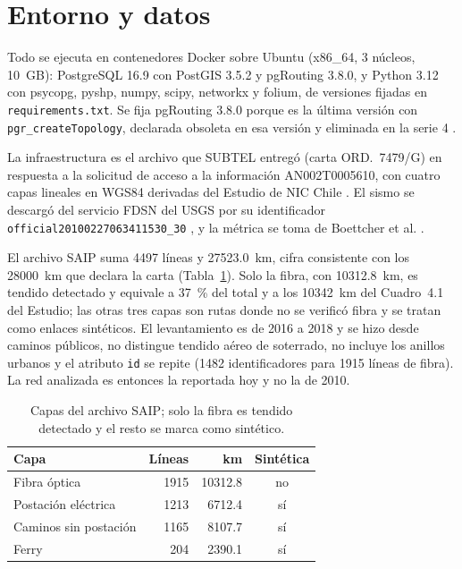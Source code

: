 \documentclass[conference]{IEEEtran}
\begin{document}
\section{Entorno y datos}
\label{sec:datos}
Todo se ejecuta en contenedores Docker sobre Ubuntu (x86\_64, 3 núcleos, \SI{10}{GB}): PostgreSQL 16.9 con PostGIS 3.5.2 y pgRouting 3.8.0, y Python 3.12 con psycopg, pyshp, numpy, scipy, networkx y folium, de versiones fijadas en \texttt{requirements.txt}.
Se fija pgRouting 3.8.0 porque es la última versión con \texttt{pgr\_createTopology}, declarada obsoleta en esa versión y eliminada en la serie 4 \cite{pgrouting38}.

La infraestructura es el archivo que SUBTEL entregó (carta ORD.~7479/G) en respuesta a la solicitud de acceso a la información AN002T0005610, con cuatro capas lineales en WGS84 derivadas del Estudio de NIC Chile \cite{niclabs2018,subtel2023saip}.
El sismo se descargó del servicio FDSN del USGS por su identificador \texttt{official20100227063411530\_30} \cite{usgs2010maule}, y la métrica se toma de Boettcher et al. \cite{boettcher2018}.

El archivo SAIP suma \num{4497} líneas y \SI{27523,0}{km}, cifra consistente con los \SI{28000}{km} que declara la carta (Tabla~\ref{tab:capas}).
Solo la fibra, con \SI{10312,8}{km}, es tendido detectado y equivale a \SI{37}{\percent} del total y a los \SI{10342}{km} del Cuadro~4.1 del Estudio; las otras tres capas son rutas donde no se verificó fibra y se tratan como enlaces sintéticos.
El levantamiento es de 2016 a 2018 y se hizo desde caminos públicos, no distingue tendido aéreo de soterrado, no incluye los anillos urbanos y el atributo \texttt{id} se repite (\num{1482} identificadores para \num{1915} líneas de fibra). La red analizada es entonces la reportada hoy y no la de 2010.

\begin{table}[t]
\centering
\caption{Capas del archivo SAIP; solo la fibra es tendido detectado y el resto se marca como sintético.}
\label{tab:capas}
\footnotesize
\begin{tabular}{@{}lrrc@{}}
\toprule
Capa & Líneas & km & Sintética \\
\midrule
Fibra óptica & \num{1915} & \num{10312,8} & no \\
Postación eléctrica & \num{1213} & \num{6712,4} & sí \\
Caminos sin postación & \num{1165} & \num{8107,7} & sí \\
Ferry & \num{204} & \num{2390,1} & sí \\
\bottomrule
\end{tabular}
\end{table}
\end{document}
